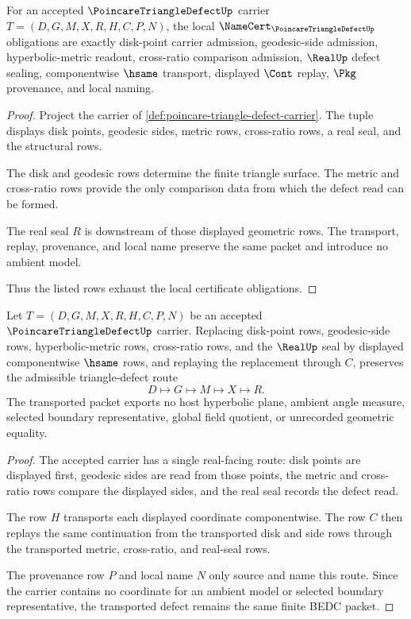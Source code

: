 \begin{theorem}
\label{thm:poincare-triangle-defect-namecert-obligations}
For an accepted $\PoincareTriangleDefectUp$ carrier $T=(D,G,M,X,R,H,C,P,N)$, the local $\NameCert_{\PoincareTriangleDefectUp}$ obligations are exactly disk-point carrier admission, geodesic-side admission, hyperbolic-metric readout, cross-ratio comparison admission, $\RealUp$ defect sealing, componentwise $\hsame$ transport, displayed $\Cont$ replay, $\Pkg$ provenance, and local naming.
\end{theorem}
\begin{proof}
Project the carrier of \autoref{def:poincare-triangle-defect-carrier}. The tuple displays disk points, geodesic sides, metric rows, cross-ratio rows, a real seal, and the structural rows.

The disk and geodesic rows determine the finite triangle surface. The metric and cross-ratio rows provide the only comparison data from which the defect read can be formed.

The real seal $R$ is downstream of those displayed geometric rows. The transport, replay, provenance, and local name preserve the same packet and introduce no ambient model.

Thus the listed rows exhaust the local certificate obligations.
\end{proof}

\begin{theorem}
\label{thm:poincare-triangle-defect-transport-stability}
Let $T=(D,G,M,X,R,H,C,P,N)$ be an accepted $\PoincareTriangleDefectUp$ carrier. Replacing disk-point rows, geodesic-side rows, hyperbolic-metric rows, cross-ratio rows, and the $\RealUp$ seal by displayed componentwise $\hsame$ rows, and replaying the replacement through $C$, preserves the admissible triangle-defect route
$$
D\longmapsto G\longmapsto M\longmapsto X\longmapsto R .
$$
The transported packet exports no host hyperbolic plane, ambient angle measure, selected boundary representative, global field quotient, or unrecorded geometric equality.
\end{theorem}
\begin{proof}
The accepted carrier has a single real-facing route: disk points are displayed first, geodesic sides are read from those points, the metric and cross-ratio rows compare the displayed sides, and the real seal records the defect read.

The row $H$ transports each displayed coordinate componentwise. The row $C$ then replays the same continuation from the transported disk and side rows through the transported metric, cross-ratio, and real-seal rows.

The provenance row $P$ and local name $N$ only source and name this route. Since the carrier contains no coordinate for an ambient model or selected boundary representative, the transported defect remains the same finite BEDC packet.
\end{proof}

